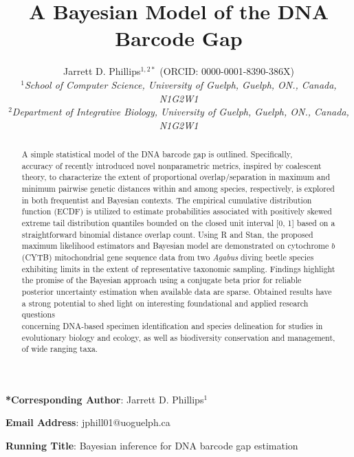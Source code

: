 \documentclass[12pt]{article}
\makeatletter
\renewcommand{\maketitle}{\bgroup\setlength{\parindent}{0pt}
\begin{flushleft}
\textbf{\@title}

  \@author
\end{flushleft}\egroup
}
\makeatother
\begin{document}
\linenumbers

\title{A Bayesian Model of the DNA Barcode Gap}

\author{Jarrett D. Phillips$^{1, 2*}$ (ORCID: 0000-0001-8390-386X)  \\
\textit{$^1$School of Computer Science, University of Guelph, Guelph, ON., Canada, N1G2W1} \\ \textit{$^2$Department of Integrative Biology, University of Guelph, Guelph, ON., Canada, N1G2W1} }

\date{}

\maketitle

\vspace{2mm}

\noindent \textbf{*Corresponding Author}: Jarrett D. Phillips$^{1}$

\noindent \textbf{Email Address}: jphill01@uoguelph.ca

\noindent \textbf{Running Title}: Bayesian inference for DNA barcode gap estimation

\newpage

\begin{abstract}

A simple statistical model of the DNA barcode gap is outlined. Specifically, \\ accuracy of recently introduced novel nonparametric metrics, inspired by coalescent theory, to characterize the extent of proportional overlap/separation in maximum and minimum pairwise genetic distances within and among species, respectively, is explored in both frequentist and Bayesian contexts. The empirical cumulative distribution function (ECDF) is utilized to estimate probabilities associated with positively skewed extreme tail distribution quantiles bounded on the closed unit interval [0, 1] based on a straightforward binomial distance overlap count. Using R and Stan, the proposed maximum likelihood estimators and Bayesian model are demonstrated on cytochrome $b$ (CYTB) mitochondrial gene sequence data from two \textit{Agabus} diving beetle species exhibiting limits in the extent of representative taxonomic sampling. Findings highlight the promise of the Bayesian approach using a conjugate beta prior for reliable posterior uncertainty estimation when available data are sparse. Obtained results have a strong potential to shed light on  interesting foundational and applied research questions \\ concerning DNA-based specimen identification and species delineation for studies in evolutionary biology and ecology, as well as biodiversity conservation and management, of wide ranging taxa.

\end{abstract}
\end{document}
